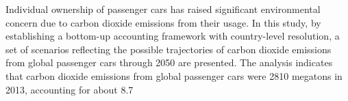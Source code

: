 Individual ownership of passenger cars has raised significant environmental concern due to carbon dioxide emissions from their usage. In this study, by establishing a bottom-up accounting framework with country-level resolution, a set of scenarios reflecting the possible trajectories of carbon dioxide emissions from global passenger cars through 2050 are presented. The analysis indicates that carbon dioxide emissions from global passenger cars were 2810 megatons in 2013, accounting for about 8.7%